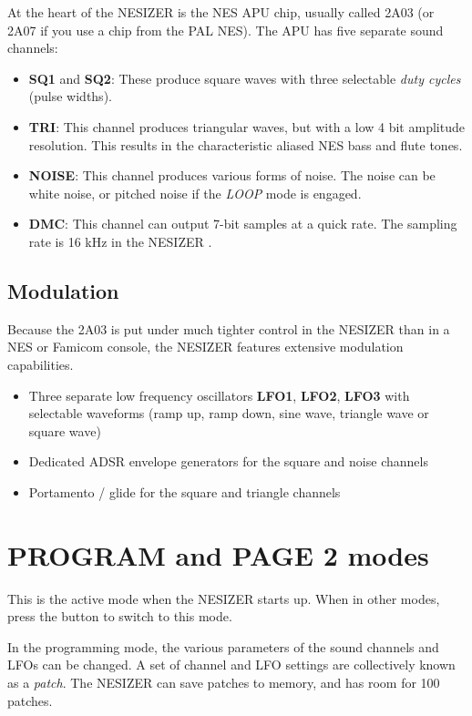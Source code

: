 \documentclass[a4paper, 12p]{extarticle}
\newcommand \name {NESIZER }
\newcommand {\btn}[1] {\framebox{\textbf{\footnotesize #1}}}
\newcommand {\lbl}[1] {\emph{\footnotesize #1}}
\begin{document}
At the heart of the \name is the NES APU chip, usually called 2A03 (or 2A07 if you use a chip from the PAL NES). The APU has five separate sound channels:

\begin{itemize}
\item \textbf{SQ1} and \textbf{SQ2}: These produce square waves with three selectable \emph{duty cycles} (pulse widths).
\item \textbf{TRI}: This channel produces triangular waves, but with a low 4 bit amplitude resolution. This results in the characteristic aliased NES bass and flute tones.
\item \textbf{NOISE}: This channel produces various forms of noise. The noise can be white noise, or pitched noise if the \lbl{LOOP} mode is engaged.
\item \textbf{DMC}: This channel can output 7-bit samples at a quick rate. The sampling rate is 16 kHz in the \name.
\end{itemize}

\subsection{Modulation}

Because the 2A03 is put under much tighter control in the \name than in a NES or Famicom console, the \name features extensive modulation capabilities.

\begin{itemize}
\item Three separate low frequency oscillators \textbf{LFO1}, \textbf{LFO2}, \textbf{LFO3} with selectable waveforms (ramp up, ramp down, sine wave, triangle wave or square wave)
\item Dedicated ADSR envelope generators for the square and noise channels
\item Portamento / glide for the square and triangle channels
\end{itemize}

\section{PROGRAM and PAGE 2 modes}

This is the active mode when the \name starts up. When in other modes, press the \btn{PROGRAM} button to switch to this mode.

In the programming mode, the various parameters of the sound channels and LFOs can be changed. A set of channel and LFO settings are collectively known as a \emph{patch}. The \name can save patches to memory, and has room for 100 patches.
\end{document}
